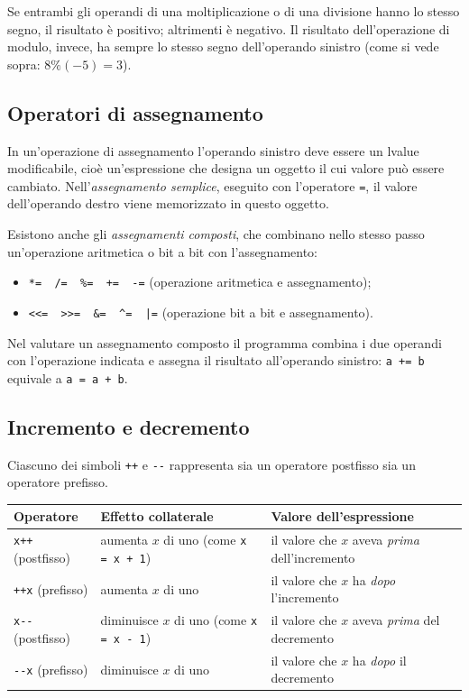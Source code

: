 \documentclass[11pt,a4paper]{article}
\begin{document}
\begin{osservazione}
Se entrambi gli operandi di una moltiplicazione o di una divisione hanno lo stesso segno, il risultato è positivo; altrimenti è negativo. Il risultato dell'operazione di modulo, invece, ha sempre lo stesso segno dell'operando sinistro (come si vede sopra: $8 \% (-5) = 3$).
\end{osservazione}

\subsection{Operatori di assegnamento}

In un'operazione di assegnamento l'operando sinistro deve essere un lvalue modificabile, cioè un'espressione che designa un oggetto il cui valore può essere cambiato. Nell'\emph{assegnamento semplice}, eseguito con l'operatore \lstinline|=|, il valore dell'operando destro viene memorizzato in questo oggetto.

Esistono anche gli \emph{assegnamenti composti}, che combinano nello stesso passo un'operazione aritmetica o bit a bit con l'assegnamento:
\begin{itemize}
    \item \lstinline|*=  /=  %=  +=  -=| (operazione aritmetica e assegnamento);
    \item \lstinline!<<=  >>=  &=  ^=  |=! (operazione bit a bit e assegnamento).
\end{itemize}
Nel valutare un assegnamento composto il programma combina i due operandi con l'operazione indicata e assegna il risultato all'operando sinistro: \lstinline|a += b| equivale a \lstinline|a = a + b|.

\subsection{Incremento e decremento}

Ciascuno dei simboli \lstinline|++| e \lstinline|--| rappresenta sia un operatore postfisso sia un operatore prefisso.

\begin{center}
\begin{tabular}{l p{5cm} p{5cm}}
\toprule
Operatore & Effetto collaterale & Valore dell'espressione\\
\midrule
\lstinline|x++| (postfisso) & aumenta $x$ di uno (come \lstinline|x = x + 1|) & il valore che $x$ aveva \emph{prima} dell'incremento\\
\lstinline|++x| (prefisso) & aumenta $x$ di uno & il valore che $x$ ha \emph{dopo} l'incremento\\
\lstinline|x--| (postfisso) & diminuisce $x$ di uno (come \lstinline|x = x - 1|) & il valore che $x$ aveva \emph{prima} del decremento\\
\lstinline|--x| (prefisso) & diminuisce $x$ di uno & il valore che $x$ ha \emph{dopo} il decremento\\
\bottomrule
\end{tabular}
\end{center}
\end{document}
